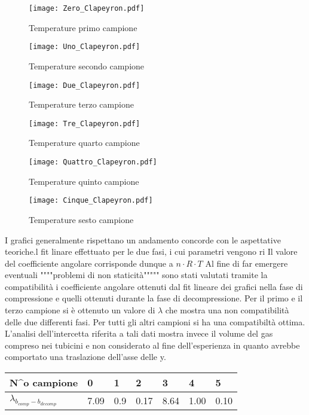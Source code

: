 \documentclass[a4paper,11pt,oneside]{article}
\begin{document}
\begin{figure}[h!]
    \centering
    \texttt{[image: Zero\_Clapeyron.pdf]}
    \caption{Temperature primo campione}
    \label{fig:campionezero_clapeyron}
\end{figure}
\begin{figure}[h!]
    \centering
    \texttt{[image: Uno\_Clapeyron.pdf]}
    \caption{Temperature secondo campione}
    \label{fig:campioneuno_clapeyron}
\end{figure}
\begin{figure}[h!]
    \centering
    \texttt{[image: Due\_Clapeyron.pdf]}
    \caption{Temperature terzo campione}
    \label{fig:campionedue_clapeyron}
\end{figure}
\begin{figure}[h!]
    \centering
    \texttt{[image: Tre\_Clapeyron.pdf]}
    \caption{Temperature quarto campione}
    \label{fig:campionetre_clapeyron}
\end{figure}
\begin{figure}[h!]
    \centering
    \texttt{[image: Quattro\_Clapeyron.pdf]}
    \caption{Temperature quinto campione}
    \label{fig:campionequattro_clapeyron}
\end{figure}
\begin{figure}[h!]
    \centering
    \texttt{[image: Cinque\_Clapeyron.pdf]}
    \caption{Temperature sesto campione}
    \label{fig:campionecinque_clapeyron}
\end{figure}
I grafici generalmente rispettano un andamento concorde con le aspettative teoriche.l fit linare effettuato per le due fasi, i cui parametri vengono ri Il valore del coefficiente angolare corrisponde dunque a $n \cdot R \cdot T$ Al fine di far emergere eventuali """"problemi di non staticità""""" sono stati valutati tramite la compatibilità i coefficiente angolare ottenuti dal fit lineare dei grafici nella fase di compressione e quelli ottenuti durante la fase di decompressione. Per il primo e il terzo campione si è ottenuto un valore di $\lambda$ che mostra una non compatibilità delle due differenti fasi. Per tutti gli altri campioni si ha una compatibiltà ottima.
L'analisi dell'intercetta riferita a tali dati mostra invece il volume del gas compreso nei tubicini e non considerato al fine dell'esperienza in quanto avrebbe comportato una traslazione dell'asse delle y. 


\begin{table}[h!]
\centering
\begin{tabular}{|l|l|l|l|l|l|l|}
\hline
N^o campione & 0    & 1   & 2    & 3    & 4    & 5    \\ \hline
$\lambda_{b_{comp}-b_{decomp}}$ & 7.09 & 0.9 & 0.17 & 8.64 & 1.00 & 0.10 \\ \hline
\end{tabular}
\end{table}
\end{document}

